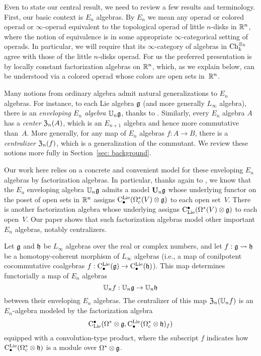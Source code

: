 \documentclass[11pt]{amsart}
\numberwithin{equation}{section}
\def\owen{\textcolor{magenta}{OG: }\textcolor{magenta}}
\begin{document}

Even to state our central result, we need to review a few results and terminology.
First, our basic context is $E_n$ algebras.
By $E_n$ we mean any operad or colored operad or $\infty$-operad equivalent to the topological operad of little $n$-disks in $\mathbb R^n$, where the notion of equivalence is in some appropriate $\infty$-categorical setting of operads. 
In particular, we will require that its $\infty$-category of algebras in ${\rm Ch}_k^{\otimes_k}$ agree with those of the little $n$-disks operad. 
For us the preferred presentation is by locally constant factorization algebras on $\mathbb R^n$,
which, as we explain below, can be understood via a colored operad whose colors are open sets in~$\mathbb R^n$.

Many notions from ordinary algebra admit natural generalizations to $E_n$ algebras.
For instance, to each Lie algebra $\mathfrak g$ (and more generally $L_\infty$ algebra),
there is an {\em enveloping $E_n$ algebra} $\mathbb U_n \mathfrak g$, thanks to \cite{Knudsen}.
Similarly, every $E_n$ algebra $A$ has a {\em center} ${\frak Z}_n(A)$, which is an $E_{n+1}$ algebra and hence more commutative than~$A$.
More generally, for any map of $E_n$ algebras $f: A \to B$, there is a {\em centralizer} ${\frak Z}_n(f)$, 
which is a generalization of the commutant.
We review these notions more fully in Section~\ref{sec: background}.

Our work here relies on a concrete and convenient model for these enveloping $E_n$ algebras by factorization algebras.
In particular, thanks again to \cite{Knudsen}, 
we know that the $E_n$ enveloping algebra $\mathbb U_n \mathfrak g$ admits a model $\mathbf U_n \mathfrak g$ whose underlying functor on the poset of open sets in $\mathbb R^n$ assigns ${\rm C}^{\rm Lie}_\bullet(\Omega_c^*(V) \otimes \mathfrak g)$ to each open set~$V$.
There is another factorization algebra whose underlying assigns ${\rm C}_{\rm Lie}^\bullet(\Omega^*(V) \otimes \mathfrak g)$ to each open~$V$.
Our paper shows that such factorization algebras model other important $E_n$ algebras, notably centralizers.

\begin{thm}
\label{thm: centralizer}
Let $\mathfrak g$ and $\mathfrak h$ be $L_\infty$ algebras over the real or complex numbers, 
and let $f: \mathfrak g \rightsquigarrow \mathfrak h$ be a homotopy-coherent morphism of $L_\infty$ algebras
(i.e., a map of conilpotent cocommutative coalgebras $f: {\rm C}^{\rm Lie}_\bullet(\mathfrak g) \to {\rm C}^{\rm Lie}_\bullet(\mathfrak h)$).
This map determines functorially a map of $E_n$ algebras
\[
\mathbb U_n f: \mathbb U_n \mathfrak g \to \mathbb U_n \mathfrak h
\]
between their enveloping $E_n$ algebras.
The centralizer of this map ${\frak Z}_n(\mathbb U_n f)$ is an $E_n$-algebra modeled by the factorization algebra 
\[
{\rm C}_{\rm Lie}^\bullet(\Omega^* \otimes \mathfrak g, {\rm C}^{\rm Lie}_\bullet(\Omega^*_c \otimes \mathfrak h)_f)
\]
equipped with a convolution-type product,
where the subscript $f$ indicates how ${\rm C}^{\rm Lie}_\bullet(\Omega^*_c \otimes \mathfrak h)$ is a module over $\Omega^* \otimes \mathfrak g$.
\end{thm}
\end{document}
